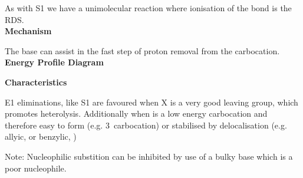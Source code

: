 As with S1 we have a unimolecular reaction where ionisation of the 
bond is the RDS.\\

\textbf{Mechanism}


The base can assist in the fast step of proton removal from the carbocation.\\

\textbf{Energy Profile Diagram}


\textbf{Characteristics}

E1 eliminations, like S1 are favoured when X is a very good leaving group,
which promotes heterolysis. Additionally when  is a low energy carbocation
and therefore easy to form (e.g. 3\de\ carbocation) or stabilised by
delocalisation (e.g. allyic,  or benzylic, )

Note: Nucleophilic substition can be inhibited by use of a bulky base which is a
poor nucleophile.